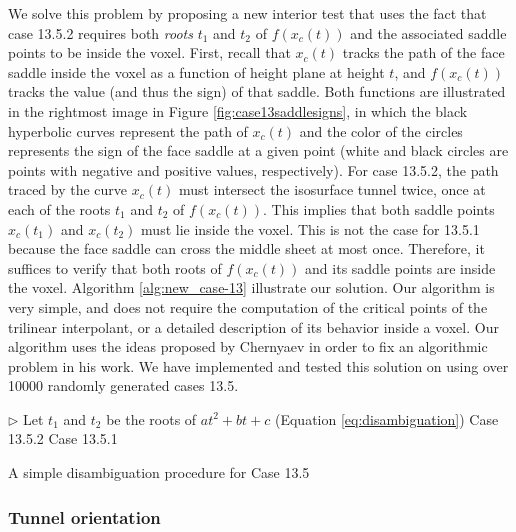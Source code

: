 We solve this problem by proposing a new interior test that uses the fact that case 13.5.2 requires both \emph{roots} $t_1$ and $t_2$ of $f(x_c(t))$ and the associated saddle points to be inside the voxel. 
%
First, recall that $x_c(t)$ tracks the path of the face saddle inside the voxel as a function of height plane at height $t$, and $f(x_c(t))$ tracks the value (and thus the sign) of that saddle. Both functions are illustrated in the rightmost image in Figure \ref{fig:case13saddlesigns}, in which the black hyperbolic curves represent the path of $x_c(t)$ and the color of the circles represents the sign of the face saddle at a given point (white and black circles are points with negative and positive values, respectively).
%
For case 13.5.2, the path traced by the curve $x_c(t)$ must intersect the isosurface tunnel twice, once at each of the roots $t_1$ and $t_2$ of $f(x_c(t))$. 
This implies that both saddle points $x_c(t_1)$ and $x_c(t_2)$ must lie inside the voxel. This is not the case for 13.5.1 because the face saddle can cross the middle sheet at most once. Therefore, it suffices to verify that both roots of $f(x_c(t))$ and its saddle points are inside the voxel. Algorithm \ref{alg:new_case-13} illustrate our solution. Our algorithm is very simple, and does not require the computation of the critical points of the trilinear interpolant, or a detailed description of its behavior inside a voxel. Our algorithm uses the ideas proposed by Chernyaev in order to fix an algorithmic problem in his work.
%
We have implemented and tested this solution on \cmc{} using over 10000 randomly generated cases 13.5.

\begin{algorithm}[t]
\begin{codebox}
\zi $\rhd$ Let $t_1$ and $t_2$ be the roots of $a t^2 + b t + c$ (Equation \eqref{eq:disambiguation})
\li {} 
\li	\Then \Return Case 13.5.2
\li	 \Else \Return  Case 13.5.1
\End
\end{codebox}
\caption{\label{alg:new_case-13}A simple disambiguation procedure for Case 13.5}
\end{algorithm}

\subsubsection{Tunnel orientation}

